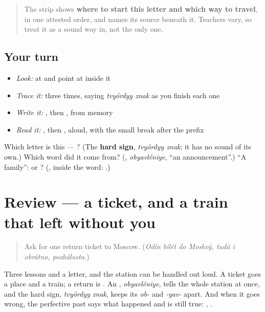 \begin{quote}
The strip shows \textbf{where to start this letter and which way to travel}, in one attested order, and names its source beneath it. Teachers vary, so treat it as a sound way in, not the only one.
\end{quote}

\subsection*{Your turn}
\begin{itemize}
\raggedright
  \item \emph{Look:} at \textbf{} and point at  inside it
  \item \emph{Trace it:}  three times, saying \emph{tvyórdyy znak} as you finish each one
  \item \emph{Write it:} , then , from memory
  \item \emph{Read it:} \textbf{}, then \textbf{}, aloud, with the small break after the prefix
\end{itemize}

\begin{tcolorbox}[breakable,colback=teal!4,colframe=teal!35!black,title={Before you move on}]
Which letter is this — ? (The \textbf{hard sign}, \emph{tvyórdyy znak}; it has no sound of its own.) Which word did it come from? (\textbf{}, \emph{obyavléniye}, \textquotedblleft{}an announcement\textquotedblright{}.) \textquotedblleft{}A family\textquotedblright{}:  or ? (\textbf{}, inside the word: \textbf{}.)
\end{tcolorbox}
\section[(review)]{Review — a ticket, and a train that left without you}

\label{lesson:RU-C266-review}



\begin{quote}
Ask for one return ticket to Moscow. (\emph{Odín bilét do Moskvý, tudá i obrátno, pozhálusta.})
\end{quote}

\begin{grammarlens}[title={What you've built}]
Three lessons and a letter, and the station can be handled out loud. A ticket goes \textbf{} a place and \textbf{} a train; a return is \textbf{  }. An \textbf{}, \emph{obyavléniye}, tells the whole station at once, and the hard sign, \emph{tvyórdyy znak}, keeps its \emph{ob-} and \emph{-yav-} apart. And when it goes wrong, the perfective past says what happened and is still true: \textbf{   }, \textbf{  }.
\end{grammarlens}

